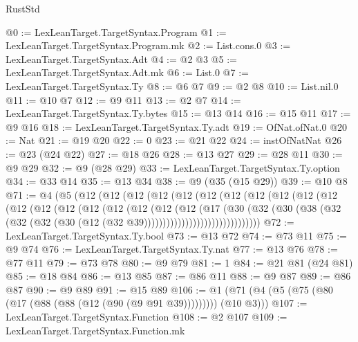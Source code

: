 \begin{lexlean}{RustStd}
\begin{coremodule}
@0 := LexLeanTarget.TargetSyntax.Program
@1 := LexLeanTarget.TargetSyntax.Program.mk
@2 := List.cons.{0}
@3 := LexLeanTarget.TargetSyntax.Adt
@4 := @2 @3
@5 := LexLeanTarget.TargetSyntax.Adt.mk
@6 := List.{0}
@7 := LexLeanTarget.TargetSyntax.Ty
@8 := @6 @7
@9 := @2 @8
@10 := List.nil.{0}
@11 := @10 @7
@12 := @9 @11
@13 := @2 @7
@14 := LexLeanTarget.TargetSyntax.Ty.bytes
@15 := @13 @14
@16 := @15 @11
@17 := @9 @16
@18 := LexLeanTarget.TargetSyntax.Ty.adt
@19 := OfNat.ofNat.{0}
@20 := Nat
@21 := @19 @20
@22 := 0
@23 := @21 @22
@24 := instOfNatNat
@26 := @23 (@24 @22)
@27 := @18 @26
@28 := @13 @27
@29 := @28 @11
@30 := @9 @29
@32 := @9 (@28 @29)
@33 := LexLeanTarget.TargetSyntax.Ty.option
@34 := @33 @14
@35 := @13 @34
@38 := @9 (@35 (@15 @29))
@39 := @10 @8
@71 := @4
    (@5
      (@12
        (@12
          (@12
            (@12
              (@12
                (@12
                  (@12
                    (@12
                      (@12
                        (@12
                          (@12
                            (@12
                              (@12
                                (@12
                                  (@12
                                    (@12
                                      (@12
                                        (@12
                                          (@12
                                            (@17
                                              (@30
                                                (@32
                                                  (@30
                                                    (@38
                                                      (@32
                                                        (@32
                                                          (@32
                                                            (@30
                                                              (@12
                                                                (@32
                                                                  @39)))))))))))))))))))))))))))))))
@72 := LexLeanTarget.TargetSyntax.Ty.bool
@73 := @13 @72
@74 := @73 @11
@75 := @9 @74
@76 := LexLeanTarget.TargetSyntax.Ty.nat
@77 := @13 @76
@78 := @77 @11
@79 := @73 @78
@80 := @9 @79
@81 := 1
@84 := @21 @81 (@24 @81)
@85 := @18 @84
@86 := @13 @85
@87 := @86 @11
@88 := @9 @87
@89 := @86 @87
@90 := @9 @89
@91 := @15 @89
@106 := @1 (@71 (@4 (@5 (@75 (@80 (@17 (@88 (@88 (@12 (@90 (@9 @91 @39))))))))) (@10 @3)))
@107 := LexLeanTarget.TargetSyntax.Function
@108 := @2 @107
@109 := LexLeanTarget.TargetSyntax.Function.mk

\end{coremodule}
\end{lexlean}
